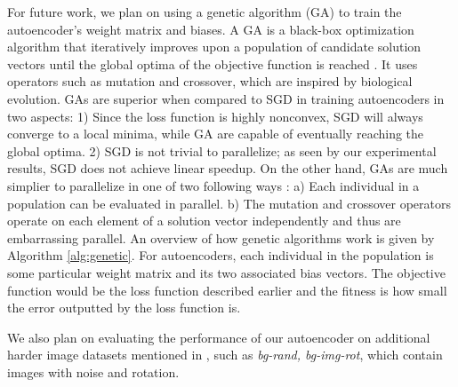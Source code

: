 For future work, we plan on using a genetic algorithm (GA) to train the autoencoder's weight matrix and biases. A GA is a black-box optimization algorithm that iteratively improves upon a population of candidate solution vectors until the global optima of the objective function is reached \cite{srinivas1994genetic}. It uses operators such as mutation and crossover, which are inspired by biological evolution. GAs are superior when compared to SGD in training autoencoders in two aspects: 1) Since the loss function is highly nonconvex, SGD will always converge to a local minima, while GA are capable of eventually reaching the global optima. 2) SGD is not trivial to parallelize; as seen by our experimental results, SGD does not achieve linear speedup. On the other hand, GAs are much simplier to parallelize in one of two following ways \cite{cantu1998survey}: a) Each individual in a population can be evaluated in parallel. b) The mutation and crossover operators operate on each element of a solution vector independently and thus are embarrassing parallel. An overview of how genetic algorithms work is given by Algorithm \ref{alg:genetic}. For autoencoders, each individual in the population is some particular weight matrix and its two associated bias vectors. The objective function would be the loss function described earlier and the fitness is how small the error outputted by the loss function is. 


We also plan on evaluating the performance of our autoencoder on additional harder image datasets mentioned in \cite{vincent2010stacked}, such as \textit{bg-rand, bg-img-rot}, which contain images with noise and rotation. 

